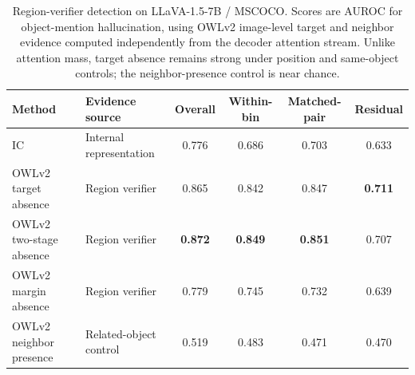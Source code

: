 \begin{table}[t]
\centering
\small
\begin{tabular}{llcccc}
\toprule
Method & Evidence source & Overall & Within-bin & Matched-pair & Residual \\
\midrule
IC & Internal representation & 0.776 & 0.686 & 0.703 & 0.633 \\
\midrule
OWLv2 target absence & Region verifier & 0.865 & 0.842 & 0.847 & \textbf{0.711} \\
OWLv2 two-stage absence & Region verifier & \textbf{0.872} & \textbf{0.849} & \textbf{0.851} & 0.707 \\
OWLv2 margin absence & Region verifier & 0.779 & 0.745 & 0.732 & 0.639 \\
OWLv2 neighbor presence & Related-object control & 0.519 & 0.483 & 0.471 & 0.470 \\
\bottomrule
\end{tabular}
\caption{Region-verifier detection on LLaVA-1.5-7B / MSCOCO. Scores are AUROC for object-mention hallucination, using OWLv2 image-level target and neighbor evidence computed independently from the decoder attention stream. Unlike attention mass, target absence remains strong under position and same-object controls; the neighbor-presence control is near chance.}
\label{tab:region-verifier-detection}
\end{table}
